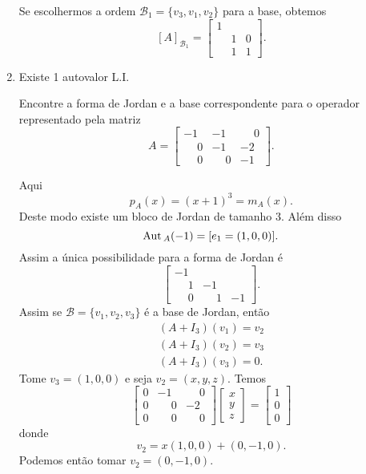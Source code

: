 \begin{enumerate}[label={\arabic*})]
\begin{solucao}
		Se escolhermos a ordem $\mathcal{B}_1 = \{v_3, v_1, v_2\}$ para a base, obtemos
				\[
					[A]_{\mathcal{B}_1} = \begin{bmatrix}
				 			1 &  &\\
				 			& 1 & 0\\
				 			& 1 & 1
						\end{bmatrix}.
				\]

	\end{solucao}
	\item Existe 1 autovalor L.I.

	Encontre a forma de Jordan e a base correspondente para o operador representado pela matriz
	\[
		A = \begin{bmatrix}
			-1 & -1 & \phantom{-}0\\
			\phantom{-}0 & -1 & -2\\
			\phantom{-}0 & \phantom{-}0 & -1
		\end{bmatrix}.
	\]
	\begin{solucao}
	Aqui
	\[
		p_A(x) = (x + 1)^3 = m_A(x).
	\]
	Deste modo existe um bloco de Jordan de tamanho 3. Al\'em disso
	\[
		{\rm Aut\,}_A(-1) = [e_1 = (1,0,0)].
	\]
	Assim a \'unica possibilidade para a forma de Jordan \'e
	\[
		\begin{bmatrix}
			-1 & & \\
			\phantom{-}1 & -1 &\\
			\phantom{-}0 & \phantom{-}1 & -1
		\end{bmatrix}.
	\]
	Assim se $\mathcal{B} = \{v_1, v_2, v_3\}$ \'e a base de Jordan, ent\~ao
	\begin{align*}
		(A + I_3)(v_1) = v_2\\
		(A + I_3)(v_2) = v_3\\
		(A + I_3)(v_3) = 0.
	\end{align*}
	Tome $v_3 = (1,0,0)$ e seja $v_2 = (x,y,z)$. Temos
	\[
		\begin{bmatrix}
			0 & -1 & \phantom{-}0\\
			0 & \phantom{-}0 & -2\\
			0 & \phantom{-}0 & \phantom{-}0
		\end{bmatrix}\begin{bmatrix}
			x\\
			y\\
			z
		\end{bmatrix} = \begin{bmatrix}
			1\\
			0\\
			0
		\end{bmatrix}
	\]
	donde
	\[
		v_2 = x(1,0,0) + (0,-1,0).
	\]
	Podemos ent\~ao tomar $v_2 = (0,-1,0)$.


\end{solucao}
\end{enumerate}
